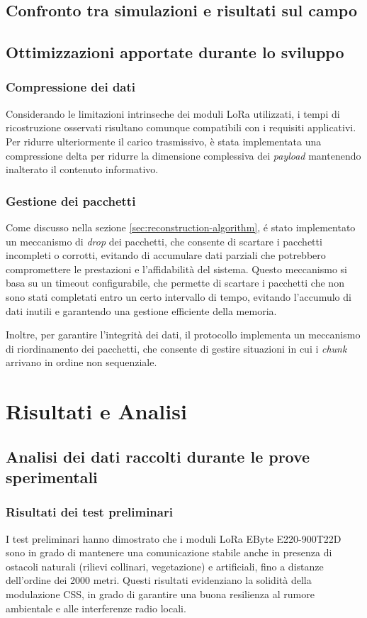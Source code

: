 \documentclass[12pt,a4paper,twoside]{book}
\begin{document}
\section{Confronto tra simulazioni e risultati sul campo}
\section{Ottimizzazioni apportate durante lo sviluppo}
\subsection{Compressione dei dati}
Considerando le limitazioni intrinseche dei moduli \ac{LoRa} utilizzati,
i tempi di ricostruzione osservati risultano comunque compatibili con i requisiti applicativi.
Per ridurre ulteriormente il carico trasmissivo, è stata implementata una compressione
delta per ridurre la dimensione complessiva dei \emph{payload} mantenendo inalterato il contenuto informativo.
\subsection{Gestione dei pacchetti}
Come discusso nella sezione \ref{sec:reconstruction-algorithm}, \'e stato implementato
un meccanismo di \emph{drop} dei pacchetti, che consente di scartare i pacchetti
incompleti o corrotti, evitando di accumulare dati parziali che potrebbero compromettere
le prestazioni e l'affidabilità del sistema.
Questo meccanismo si basa su un timeout configurabile, che permette di scartare i pacchetti
che non sono stati completati entro un certo intervallo di tempo, evitando l'accumulo
di dati inutili e garantendo una gestione efficiente della memoria.

Inoltre, per garantire l'integrità dei dati, il protocollo implementa un meccanismo di riordinamento
dei pacchetti, che consente di gestire situazioni in cui i \emph{chunk} arrivano
in ordine non sequenziale.

\chapter{Risultati e Analisi} \label{chap:results}

\section{Analisi dei dati raccolti durante le prove sperimentali}

\subsection{Risultati dei test preliminari}
I test preliminari hanno dimostrato che i moduli \ac{LoRa} EByte E220-900T22D
sono in grado di mantenere una comunicazione stabile anche in presenza di ostacoli naturali
(rilievi collinari, vegetazione) e artificiali, fino a distanze dell’ordine dei 2000 metri.
Questi risultati evidenziano la solidità della modulazione \ac{CSS}, in grado di garantire
una buona resilienza al rumore ambientale e alle interferenze radio locali.
\end{document}
